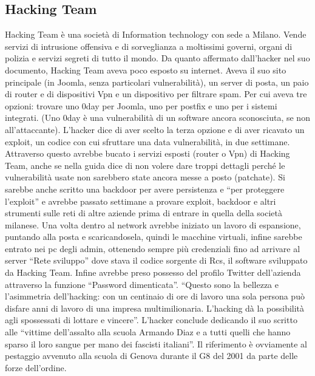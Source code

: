 \documentclass[8pt]{extarticle}
\begin{document}
\subsection{Hacking Team}
Hacking Team è una società di Information technology con sede a Milano. Vende servizi di intrusione offensiva e di 
sorveglianza a moltissimi governi, organi di polizia e servizi segreti di tutto il mondo. Da quanto affermato 
dall'hacker nel suo documento, Hacking Team aveva poco esposto su internet. Aveva il suo sito principale 
(in Joomla, senza particolari vulnerabilità), un server di posta, un paio di router e di dispositivi 
Vpn e un dispositivo per filtrare spam. Per cui aveva tre opzioni: trovare uno 0day per Joomla, 
uno per postfix e uno per i sistemi integrati. (Uno 0day è una vulnerabilità di un software ancora sconosciuta, se non all’attaccante). 
L’hacker dice di aver scelto la terza opzione e di aver ricavato un exploit, un codice con cui sfruttare una data 
vulnerabilità, in due settimane. Attraverso questo avrebbe bucato i servizi esposti (router o Vpn) di Hacking Team, 
anche se nella guida dice di non volere dare troppi dettagli perché le vulnerabilità usate 
non sarebbero state ancora messe a posto (patchate). Si sarebbe anche scritto una backdoor per avere persistenza 
e “per proteggere l’exploit” e avrebbe passato settimane a provare exploit, backdoor e altri strumenti sulle 
reti di altre aziende prima di entrare in quella della società milanese. Una volta dentro al network avrebbe 
iniziato un lavoro di espansione, puntando alla posta e scaricandosela, quindi le macchine virtuali, 
infine sarebbe entrato nei pc degli admin, ottenendo sempre più credenziali fino ad arrivare al server 
“Rete sviluppo” dove stava il codice sorgente di Rcs, il software sviluppato da Hacking Team. 
Infine avrebbe preso possesso del profilo Twitter dell’azienda attraverso la funzione “Password dimenticata”.
“Questo sono la bellezza e l’asimmetria dell’hacking: con un centinaio di ore di lavoro una sola persona può disfare 
anni di lavoro di una impresa multimilionaria. L’hacking dà la possibilità agli spossessati di lottare e vincere”.
L’hacker conclude dedicando il suo scritto alle “vittime dell’assalto alla scuola Armando Diaz e a tutti quelli 
che hanno sparso il loro sangue per mano dei fascisti italiani”. Il riferimento è ovviamente al pestaggio 
avvenuto alla scuola di Genova durante il G8 del 2001 da parte delle forze dell’ordine.
\end{document}

